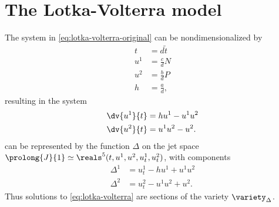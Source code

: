 \chapter{The Lotka-Volterra model}


The system in \cref{eq:lotka-volterra-original} can be nondimensionalized by
\begin{align}
  t &= d \tilde{t}\\
  u^1 &= \frac{c}{d} N\\
  u^2 &= \frac{b}{d} P\\
  h &= \frac{a}{d},
\end{align}
resulting in the system
\begin{subequations}
  \label{eq:lotka-volterra}  
  \begin{align}
    \dv{u^1}{t} &= h u^1 - u^1 u^2\\
    \dv{u^2}{t} &= u^1 u^2 - u^2.
  \end{align}
\end{subequations}
 can be represented by the function \(\Delta\) on the jet space \(\prolong{J}{1} \simeq \reals^5(t, u^1, u^2, u^1_t, u^2_t)\), with components
\begin{align}
  \Delta^1 &= u^1_t - h u^1 + u^1 u^2 \label{eq:lotka-volterra-delta1}\\
  \Delta^2 &= u^2_t - u^1 u^2 + u^2. \label{eq:lotka-volterra-delta2}
\end{align}
Thus solutions to \cref{eq:lotka-volterra} are sections of the variety \(\variety_\Delta\).

